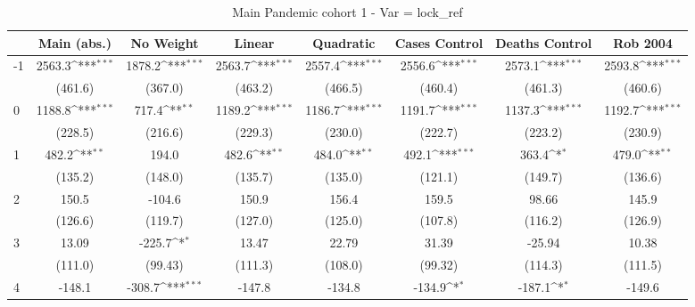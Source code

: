 \documentclass{article}
\begin{document}
{
\def\sym#1{\ifmmode^{#1}\else\(^{#1}\)\fi}
\begin{longtable}{l*{7}{c}}
\caption{Main Pandemic cohort 1 - Var = lock\_ref}\\
\hline\hline\endfirsthead\hline\endhead\hline\endfoot\endlastfoot
                &\multicolumn{1}{c}{Main (abs.)}&\multicolumn{1}{c}{No Weight}&\multicolumn{1}{c}{Linear}&\multicolumn{1}{c}{Quadratic}&\multicolumn{1}{c}{Cases Control}&\multicolumn{1}{c}{Deaths Control}&\multicolumn{1}{c}{Rob 2004}\\
\hline
-1              &   2563.3\sym{***}&   1878.2\sym{***}&   2563.7\sym{***}&   2557.4\sym{***}&   2556.6\sym{***}&   2573.1\sym{***}&   2593.8\sym{***}\\
                &  (461.6)         &  (367.0)         &  (463.2)         &  (466.5)         &  (460.4)         &  (461.3)         &  (460.6)         \\
0               &   1188.8\sym{***}&    717.4\sym{**} &   1189.2\sym{***}&   1186.7\sym{***}&   1191.7\sym{***}&   1137.3\sym{***}&   1192.7\sym{***}\\
                &  (228.5)         &  (216.6)         &  (229.3)         &  (230.0)         &  (222.7)         &  (223.2)         &  (230.9)         \\
1               &    482.2\sym{**} &    194.0         &    482.6\sym{**} &    484.0\sym{**} &    492.1\sym{***}&    363.4\sym{*}  &    479.0\sym{**} \\
                &  (135.2)         &  (148.0)         &  (135.7)         &  (135.0)         &  (121.1)         &  (149.7)         &  (136.6)         \\
2               &    150.5         &   -104.6         &    150.9         &    156.4         &    159.5         &    98.66         &    145.9         \\
                &  (126.6)         &  (119.7)         &  (127.0)         &  (125.0)         &  (107.8)         &  (116.2)         &  (126.9)         \\
3               &    13.09         &   -225.7\sym{*}  &    13.47         &    22.79         &    31.39         &   -25.94         &    10.38         \\
                &  (111.0)         &  (99.43)         &  (111.3)         &  (108.0)         &  (99.32)         &  (114.3)         &  (111.5)         \\
4               &   -148.1         &   -308.7\sym{***}&   -147.8         &   -134.8         &   -134.9\sym{*}  &   -187.1\sym{*}  &   -149.6         \\

\end{longtable}}
\end{document}

